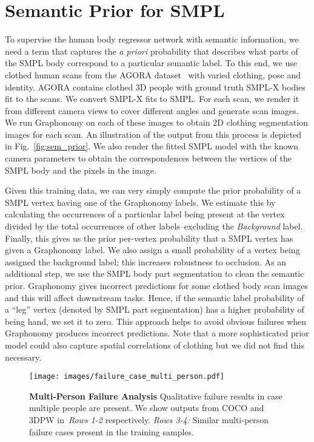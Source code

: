 \documentclass[10pt,twocolumn,letterpaper]{article}
\begin{document}
\section{Semantic Prior for SMPL}
To supervise the human body regressor network with semantic information, we need a term that captures the {\em a priori} probability that describes what parts of the SMPL body correspond to a particular semantic label. To this end, we use  clothed human scans from the AGORA dataset~\cite{agora} with varied clothing, pose and identity. 
AGORA contains clothed 3D people with ground truth SMPL-X bodies fit to the scans.
We convert SMPL-X fits to SMPL. For each scan, we render it from  different camera views to cover different angles and generate scan images.
We run Graphonomy on each of these images to obtain  2D clothing segmentation images for each scan.
An illustration of the output from this process is depicted in Fig.~\ref{fig:sem_prior}.
We also render the fitted SMPL model with the known camera parameters to obtain the correspondences between the vertices of the SMPL body and the pixels in the image.  


Given this training data, we can very simply compute the prior probability of a SMPL vertex having one of the  Graphonomy labels.
We estimate this by calculating the occurrences of a particular label being present at the vertex divided by the total occurrences of other labels--excluding the \emph{Background} label.
Finally, this gives us the prior per-vertex probability that a SMPL vertex has given a Graphonomy label.
We also assign a small probability of a vertex being assigned the background label; this increases robustness to occlusion.
As an additional step, we use the SMPL body part segmentation to clean the semantic prior. Graphonomy gives incorrect predictions for some clothed body scan images and this will affect downstream tasks. 
Hence, if the semantic label probability of a ``leg'' vertex (denoted by SMPL part segmentation) has a higher probability of being hand, we set it to zero. 
This approach helps to avoid obvious failures when Graphonomy produces incorrect predictions.
Note that a more sophisticated prior model could also capture spatial correlations of clothing but we did not find this necessary.

\begin{figure}[t]
    \texttt{[image: images/failure\_case\_multi\_person.pdf]}
    \caption{\textbf{Multi-Person Failure Analysis} Qualitative failure results in case multiple people are present. We show outputs from COCO and 3DPW in~\textit{Rows 1-2} respectively. \textit{Rows 3-4:} Similar multi-person failure cases present in the training samples.}
    \label{fig:failure_multiperson}
\end{figure}
\end{document}
